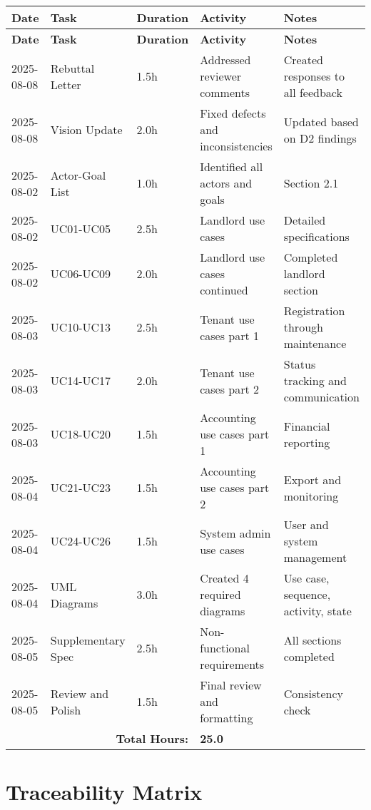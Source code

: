 \documentclass[12pt]{article}
\begin{document}
\begin{longtable}{|p{2.5cm}|p{3cm}|p{1.5cm}|p{4cm}|p{3cm}|}
\hline
\textbf{Date} & \textbf{Task} & \textbf{Duration} & \textbf{Activity} & \textbf{Notes} \\
\hline
\endfirsthead
\hline
\textbf{Date} & \textbf{Task} & \textbf{Duration} & \textbf{Activity} & \textbf{Notes} \\
\hline
\endhead

2025-08-08 & Rebuttal Letter & 1.5h & Addressed reviewer comments & Created responses to all feedback \\
\hline
2025-08-08 & Vision Update & 2.0h & Fixed defects and inconsistencies & Updated based on D2 findings \\
\hline
2025-08-02 & Actor-Goal List & 1.0h & Identified all actors and goals & Section 2.1 \\
\hline
2025-08-02 & UC01-UC05 & 2.5h & Landlord use cases & Detailed specifications \\
\hline
2025-08-02 & UC06-UC09 & 2.0h & Landlord use cases continued & Completed landlord section \\
\hline
2025-08-03 & UC10-UC13 & 2.5h & Tenant use cases part 1 & Registration through maintenance \\
\hline
2025-08-03 & UC14-UC17 & 2.0h & Tenant use cases part 2 & Status tracking and communication \\
\hline
2025-08-03 & UC18-UC20 & 1.5h & Accounting use cases part 1 & Financial reporting \\
\hline
2025-08-04 & UC21-UC23 & 1.5h & Accounting use cases part 2 & Export and monitoring \\
\hline
2025-08-04 & UC24-UC26 & 1.5h & System admin use cases & User and system management \\
\hline
2025-08-04 & UML Diagrams & 3.0h & Created 4 required diagrams & Use case, sequence, activity, state \\
\hline
2025-08-05 & Supplementary Spec & 2.5h & Non-functional requirements & All sections completed \\
\hline
2025-08-05 & Review and Polish & 1.5h & Final review and formatting & Consistency check \\
\hline
\multicolumn{3}{|r|}{\textbf{Total Hours:}} & \textbf{25.0} & \\
\hline
\end{longtable}

\section{Traceability Matrix}
\end{document}

